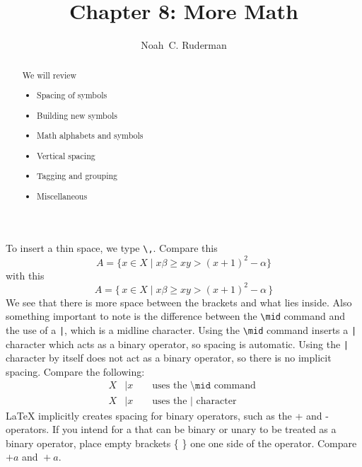 \documentclass{amsart}
\begin{document}
	\title{Chapter 8: More Math}
	\author[N.\, C. Ruderman]{Noah~C. Ruderman}

	\begin{abstract}
		We will review
		\begin{center}
		\begin{itemize}
			\item Spacing of symbols
			\item Building new symbols
			\item Math alphabets and symbols
			\item Vertical spacing
			\item Tagging and grouping
			\item Miscellaneous
		\end{itemize}
		\end{center}
	\end{abstract}

	\maketitle 

	\noindent
	To insert a thin space, we type \verb+\,+. 
	Compare this
	\[
		A = \{ x \in X \mid x \beta \geq xy > (x + 1)^2 - \alpha \}
	\]
	with this
	\[
		A = \{\, x \in X \mid x \beta \geq xy > (x + 1)^2 - \alpha \, \}
	\]
	We see that there is more space between the brackets and what lies
	inside.
	Also something important to note is the difference between the 
	\verb+\mid+ command and the use of a \verb+|+, which is a midline 
	character.
	Using the \verb+\mid+ command inserts a \verb+|+ character which 
	acts as a binary operator, so spacing is automatic. 
	Using the \verb+|+ character by itself does not act as a binary
	operator, so there is no implicit spacing. 
	Compare the following: 
	\begin{align*}
		X &\mid x 	&& \text{ uses the } 
						\texttt{\textbackslash mid} \text{ command }\\
		X &| x			&& \text{ uses the } | \text{ character }
	\end{align*}
	\LaTeX{} implicitly creates spacing for binary operators, such as 
	the + and - operators.
	If you intend for a that can be binary or unary to be treated as
	a binary operator, place empty brackets \{ \} one one side of the 
	operator. 
	Compare $+a$ and ${}+a$. 
\end{document}
